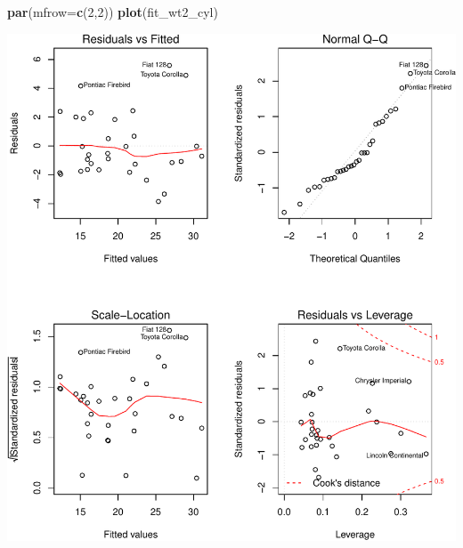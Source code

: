 \documentclass[]{article}
\newenvironment{Shaded}{\begin{snugshade}}{\end{snugshade}}
\newcommand{\KeywordTok}[1]{\textcolor[rgb]{0.13,0.29,0.53}{\textbf{{#1}}}}
\newcommand{\DataTypeTok}[1]{\textcolor[rgb]{0.13,0.29,0.53}{{#1}}}
\newcommand{\DecValTok}[1]{\textcolor[rgb]{0.00,0.00,0.81}{{#1}}}
\newcommand{\NormalTok}[1]{{#1}}
\begin{document}
\begin{Shaded}
\begin{Highlighting}[]
\KeywordTok{par}\NormalTok{(}\DataTypeTok{mfrow=}\KeywordTok{c}\NormalTok{(}\DecValTok{2}\NormalTok{,}\DecValTok{2}\NormalTok{))}
\KeywordTok{plot}\NormalTok{(fit_wt2_cyl)}
\end{Highlighting}
\end{Shaded}

\includegraphics{coursera_regression_project_files/figure-latex/Plot residuals-1.pdf}
\end{document}
